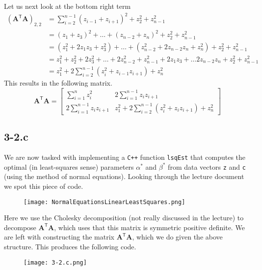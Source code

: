 \documentclass{article}
\begin{document}
Let us next look at the bottom right term
\begin{align*}
    \left(\mathbf{A}^{\mathsf{T}}\mathbf{A}\right)_{2,2} &= \sum_{i=2}^{n-1}\left(z_{i-1} +  z_{i + 1}\right)^{2} + z_{2}^{2} + z_{n-1}^{2} \\
    &= \left(z_{1} + z_{3}\right)^{2} + \dots + \left(z_{n-2}+z_{n}\right)^{2} + z_{2}^{2} + z_{n-1}^{2} \\
    &= \left(z_{1}^{2} + 2z_{1}z_{3} + z_{3}^{2}\right) + \dots + \left(z_{n-2}^{2} + 2z_{n-2}z_{n}+z_n^{2}\right) + z_{2}^{2} + z_{n-1}^{2} \\
    &= z_{1}^{2} + z_{2}^{2}+ 2z_{3}^{2}  + \dots + 2z_{n-2}^{2} + z_{n-1}^{2} + 2z_{1}z_{3} + \dots 2z_{n-2}z_{n} + z_{2}^{2} + z_{n-1}^{2} \\
    &= z_{1}^{2} + 2\sum_{i=2}^{n-1}\left(z_{i}^{2} +z_{i-1}z_{i+1}\right) + z_{n}^{2}
\end{align*}
This results in the following matrix.
\begin{equation*}
    \mathbf{A}^{\mathsf{T}}\mathbf{A} = 
    \begin{bmatrix}
        \sum_{i=1}^{n}z_{i}^{2} & 2\sum_{i=1}^{n-1}z_{i}z_{i+1} \\[1mm]
        2\sum_{i=1}^{n-1}z_{i}z_{i+1} & z_{1}^{2} + 2 \sum_{i=2}^{n-1}\left(z_{i}^{2}+z_{i}z_{i+1}\right) + z_{n}^{2}
        
    \end{bmatrix}
\end{equation*}

\pagebreak

\subsection*{3-2.c}
We are now tasked with implementing a \verb|C++| function \verb|lsqEst| that computes the optimal (in least-squares sense) parameters $\alpha^{*}$ and $\beta^{*}$ from data vectors \verb|z| and \verb|c| (using the method of normal equations). Looking through the lecture document we spot this piece of code.

\begin{figure}[!hbt]
    \centering
\texttt{[image: NormalEquationsLinearLeastSquares.png]}
\end{figure}
Here we use the Cholesky decomposition (not really discussed in the lecture) to decompose $\mathbf{A}^{\mathsf{T}}\mathbf{A}$, which uses that this matrix is symmetric positive definite. We are left with constructing the matrix $\mathbf{A}^{\mathsf{T}}\mathbf{A}$, which we do given the above structure. This produces the following code.

\begin{figure}[!hbt]
    \centering
\texttt{[image: 3-2.c.png]}
\end{figure}
\end{document}
